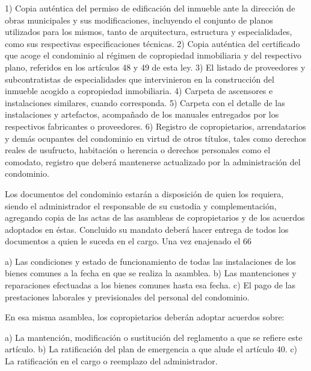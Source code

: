     1) Copia auténtica del permiso de edificación del inmueble ante la dirección de obras municipales y sus modificaciones, incluyendo el conjunto de planos utilizados para los mismos, tanto de arquitectura, estructura y especialidades, como sus respectivas especificaciones técnicas.
    2) Copia auténtica del certificado que acoge el condominio al régimen de copropiedad inmobiliaria y del respectivo plano, referidos en los artículos 48 y 49 de esta ley.
    3) El listado de proveedores y subcontratistas de especialidades que intervinieron en la construcción del inmueble acogido a copropiedad inmobiliaria.
    4) Carpeta de ascensores e instalaciones similares, cuando corresponda.
    5) Carpeta con el detalle de las instalaciones y artefactos, acompañado de los manuales entregados por los respectivos fabricantes o proveedores.
    6) Registro de copropietarios, arrendatarios y demás ocupantes del condominio en virtud de otros títulos, tales como derechos reales de usufructo, habitación o herencia o derechos personales como el comodato, registro que deberá mantenerse actualizado por la administración del condominio.
     
    Los documentos del condominio estarán a disposición de quien los requiera, siendo el administrador el responsable de su custodia y complementación, agregando copia de las actas de las asambleas de copropietarios y de los acuerdos adoptados en éstas. Concluido su mandato deberá hacer entrega de todos los documentos a quien le suceda en el cargo.
    Una vez enajenado el 66%
     
    a) Las condiciones y estado de funcionamiento de todas las instalaciones de los bienes comunes a la fecha en que se realiza la asamblea.
    b) Las mantenciones y reparaciones efectuadas a los bienes comunes hasta esa fecha.
    c) El pago de las prestaciones laborales y previsionales del personal del condominio.
     
    En esa misma asamblea, los copropietarios deberán adoptar acuerdos sobre:
     
    a) La mantención, modificación o sustitución del reglamento a que se refiere este artículo.
    b) La ratificación del plan de emergencia a que alude el artículo 40.
    c) La ratificación en el cargo o reemplazo del administrador.
     
